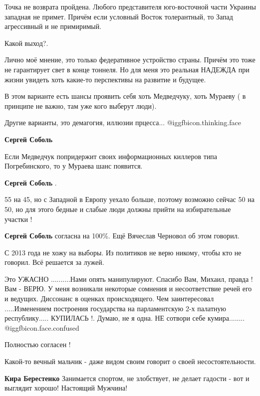 \begin{itemize}
\begin{itemize}
Точка не возврата пройдена. Любого представителя юго-восточной части Украины
западная не примет. Причём если условный Восток толерантный, то Запад
агрессивный и не примиримый.

Какой выход?.

Лично моё мнение, это только федеративное устройство страны. Причём это тоже не
гарантирует свет в конце тоннеля. Но для меня это реальная НАДЕЖДА при жизни
увидеть хоть какие-то перспективы на развитие и будущее.

В этом варианте есть шансы проявить себя хоть Медведчуку, хоть Мураеву ( в
принципе не важно, там уже кого выберут люди).

Другие варианты, это демагогия, иллюзии прцесса...  @igg{fbicon.thinking.face} 

\textbf{Сергей Соболь} 

Если Медведчук попридержит своих информационных киллеров типа Погребинского, то
у Мураева шанс появится.

\textbf{Сергей Соболь} .

55 на 45, но с Западной в Европу уехало больше, поэтому возможно сейчас 50 на
50, но для этого бедные и слабые люди должны прийти на избирательные участки !

\textbf{Сергей Соболь} согласна на 100\%. Ещё Вячеслав Черновол об этом говорил.

\end{itemize} %


С 2013 года не хожу на выборы. Из политиков не верю никому, чтобы кто не
говорил. Всё решается за лужей.


Это УЖАСНО ..........Нами опять манипулируют. Спасибо Вам, Михаил, правда !
Вам - ВЕРЮ. У меня возникали некоторые сомнения и несоответствие речей его и
ведущих. Диссонанс в оценках происходящего. Чем заинтересовал .....Изменением
построения государства на парламентскую 2-х палатную республику..... КУПИЛАСЬ !.
Думаю, не я одна. НЕ сотвори себе кумира........ @igg{fbicon.face.confused} 

Полностью согласен !

Какой-то вечный мальчик - даже видом своим говорит о своей несостоятельности.

\begin{itemize} %
\textbf{Кира Берестенко} Занимается спортом, не злобствует, не делает гадости - вот и выглядит хорошо! Настоящий Мужчина!


\end{itemize}
\end{itemize}
